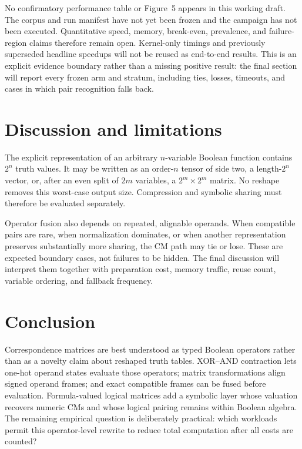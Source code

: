 \documentclass[11pt]{article}
\begin{document}
No confirmatory performance table or Figure~5 appears in this working draft.
The corpus and run manifest have not yet been frozen and the campaign has not
been executed. Quantitative speed, memory, break-even, prevalence, and failure-
region claims therefore remain open. Kernel-only timings and previously
superseded headline speedups will not be reused as end-to-end results. This is
an explicit evidence boundary rather than a missing positive result: the final
section will report every frozen arm and stratum, including ties, losses,
timeouts, and cases in which pair recognition falls back.

\section{Discussion and limitations}
\label{sec:discussion}

The explicit representation of an arbitrary $n$-variable Boolean function
contains $2^n$ truth values. It may be written as an order-$n$ tensor of side
two, a length-$2^n$ vector, or, after an even split of $2m$ variables, a
$2^m\times2^m$ matrix. No reshape removes this worst-case output size.
Compression and symbolic sharing must therefore be evaluated separately.

Operator fusion also depends on repeated, alignable operands. When compatible
pairs are rare, when normalization dominates, or when another representation
preserves substantially more sharing, the CM path may tie or lose. These are
expected boundary cases, not failures to be hidden. The final discussion will
interpret them together with preparation cost, memory traffic, reuse count,
variable ordering, and fallback frequency.

\section{Conclusion}
\label{sec:conclusion}

Correspondence matrices are best understood as typed Boolean operators rather
than as a novelty claim about reshaped truth tables. XOR--AND contraction lets
one-hot operand states evaluate those operators; matrix transformations align
signed operand frames; and exact compatible frames can be fused before
evaluation. Formula-valued logical matrices add a symbolic layer whose
valuation recovers numeric CMs and whose logical pairing remains within
Boolean algebra. The remaining empirical question is deliberately practical:
which workloads permit this operator-level rewrite to reduce total computation
after all costs are counted?





\end{document}
